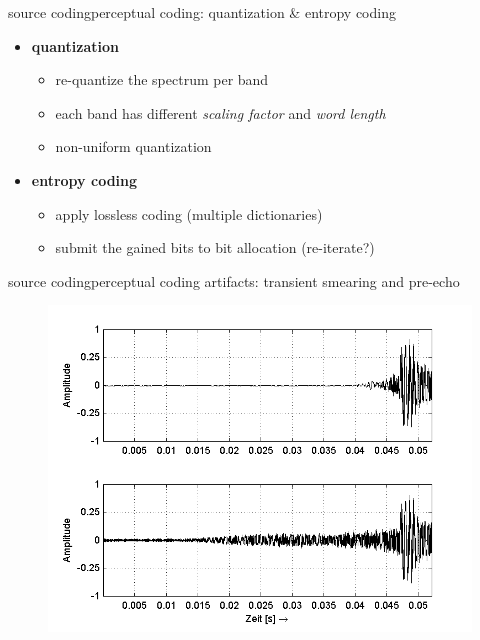 	\begin{frame}{source coding}{perceptual coding: quantization \& entropy coding}
		\begin{itemize}
			\item	\textbf{quantization}
				\begin{itemize}
					\item	re-quantize the spectrum per band
					\item	each band has different \textit{scaling factor} and \textit{word length}
                    \item   non-uniform quantization
				\end{itemize}
			\pause
			\bigskip
            \item	\textbf{entropy coding}
				\begin{itemize}
					\item	apply lossless coding (multiple dictionaries)
					\item	submit the gained bits to bit allocation (re-iterate?)
				\end{itemize}
		\end{itemize}
	\end{frame}
	
	\begin{frame}{source coding}{perceptual coding artifacts: transient smearing and pre-echo}
			\begin{figure}
				\centering
					\includegraphics[scale=0.5]{Graph/Lerch16-9}
			\end{figure}
	\end{frame}
	
